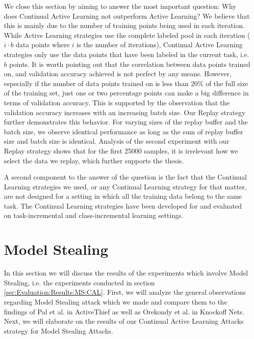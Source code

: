 We close this section by aiming to answer the most important question: Why does Continual Active Learning not outperform Active Learning? We believe that this is mainly
due to the number of training points being used in each iteration. While Active Learning strategies use the complete labeled pool in each iteration ($i \cdot b$ data
points where $i$ is the number of iterations), Continual Active Learning strategies only use the data points that have been labeled in the current task, i.e. $b$ points.
It is worth pointing out that the correlation between data points trained on, and validation accuracy achieved is not perfect by any means. However, especially if the
number of data points trained on is less than 20\% of the full size of the training set, just one or two percentage points can make a big difference in terms of validation
accuracy. This is supported by the observation that the validation accuracy increases with an increasing batch size. Our Replay strategy further demonstrates this behavior.
For varying sizes of the replay buffer and the batch size, we observe identical performance as long as the sum of replay buffer size and batch size is identical. Analysis
of the second experiment with our Replay strategy shows that for the first 25000 samples, it is irrelevant how we select the data we replay, which further supports the thesis. \par
A second component to the answer of the question is the fact that the Continual Learning strategies we used, or any Continual Learning strategy for that matter, are not
designed for a setting in which all the training data belong to the same task. The Continual Learning strategies have been developed for and evaluated on task-incremental
and class-incremental learning settings.


\section{Model Stealing}
\label{sec:Discussion:ModelStealing}
In this section we will discuss the results of the experiments which involve Model Stealing, i.e. the experiments conducted in section \ref{sec:Evaluation:Results:MS:CAL}.
First, we will analyze the general observations regarding Model Stealing attack which we made and compare them to the findings of Pal et al. in ActiveThief as well as Orekondy
et al. in Knockoff Nets. Next, we will elaborate on the results of our Continual Active Learning Attacks strategy for Model Stealing Attacks.

